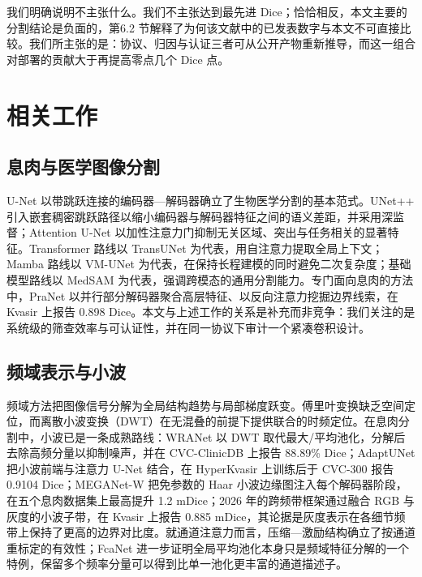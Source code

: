 \documentclass[conference]{IEEEtran}
\begin{document}
我们明确说明不主张什么。我们不主张达到最先进 Dice；恰恰相反，本文主要的分割结论是负面的，第6.2 节解释了为何该文献中的已发表数字与本文不可直接比较。我们所主张的是：协议、归因与认证三者可从公开产物重新推导，而这一组合对部署的贡献大于再提高零点几个 Dice 点。

\section{相关工作}

\subsection{息肉与医学图像分割}

U-Net 以带跳跃连接的编码器—解码器确立了生物医学分割的基本范式\cite{ronneberger2015unet}。UNet++ 引入嵌套稠密跳跃路径以缩小编码器与解码器特征之间的语义差距，并采用深监督\cite{zhou2018unetpp}；Attention U-Net 以加性注意力门抑制无关区域、突出与任务相关的显著特征\cite{oktay2018attention}。Transformer 路线以 TransUNet 为代表，用自注意力提取全局上下文\cite{chen2021transunet}；Mamba 路线以 VM-UNet 为代表，在保持长程建模的同时避免二次复杂度\cite{ruan2024vmunet}；基础模型路线以 MedSAM 为代表，强调跨模态的通用分割能力\cite{ma2024medsam}。专门面向息肉的方法中，PraNet 以并行部分解码器聚合高层特征、以反向注意力挖掘边界线索，在 Kvasir 上报告 0.898 Dice\cite{fan2020pranet}。本文与上述工作的关系是补充而非竞争：我们关注的是系统级的筛查效率与可认证性，并在同一协议下审计一个紧凑卷积设计。

\subsection{频域表示与小波}

频域方法把图像信号分解为全局结构趋势与局部梯度跃变。傅里叶变换缺乏空间定位，而离散小波变换（DWT）在无混叠的前提下提供联合的时频定位。在息肉分割中，小波已是一条成熟路线：WRANet 以 DWT 取代最大/平均池化，分解后去除高频分量以抑制噪声，并在 CVC-ClinicDB 上报告 88.89\% Dice\cite{zhao2023wranet}；AdaptUNet 把小波前端与注意力 U-Net 结合，在 HyperKvasir 上训练后于 CVC-300 报告 0.9104 Dice\cite{rajasekar2024adaptunet}；MEGANet-W 把免参数的 Haar 小波边缘图注入每个解码器阶段，在五个息肉数据集上最高提升 1.2 mDice\cite{yeemeganet2025}；2026 年的跨频带框架通过融合 RGB 与灰度的小波子带，在 Kvasir 上报告 0.885 mDice，其论据是灰度表示在各细节频带上保持了更高的边界对比度\cite{oh2026crossband}。就通道注意力而言，压缩—激励结构确立了按通道重标定的有效性\cite{hu2018senet}；FcaNet 进一步证明全局平均池化本身只是频域特征分解的一个特例，保留多个频率分量可以得到比单一池化更丰富的通道描述子\cite{qin2021fcanet}。
\end{document}
